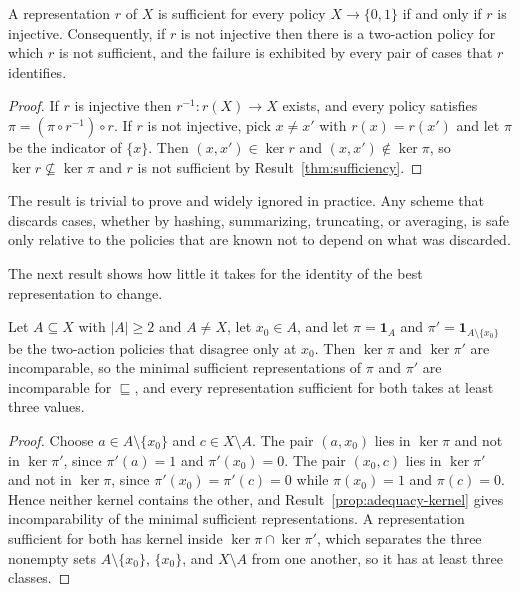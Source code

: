 \begin{newresult}\label{prop:no-free-compression}
A representation $r$ of $X$ is sufficient for every policy $X\to\{0,1\}$ if and only if $r$ is injective. Consequently, if $r$ is not injective then there is a two-action policy for which $r$ is not sufficient, and the failure is exhibited by every pair of cases that $r$ identifies.
\end{newresult}
\begin{proof}
If $r$ is injective then $r^{-1}:r(X)\to X$ exists, and every policy satisfies $\pi=(\pi\circ r^{-1})\circ r$. If $r$ is not injective, pick $x\ne x'$ with $r(x)=r(x')$ and let $\pi$ be the indicator of $\{x\}$. Then $(x,x')\in\ker r$ and $(x,x')\notin\ker\pi$, so $\ker r\not\subseteq\ker\pi$ and $r$ is not sufficient by Result~\ref{thm:sufficiency}.
\end{proof}

The result is trivial to prove and widely ignored in practice. Any scheme that discards cases, whether by hashing, summarizing, truncating, or averaging, is safe only relative to the policies that are known not to depend on what was discarded.

The next result shows how little it takes for the identity of the best representation to change.

\begin{newresult}\label{prop:sensitivity}
Let $A\subseteq X$ with $|A|\ge2$ and $A\ne X$, let $x_0\in A$, and let $\pi=\mathbf 1_A$ and $\pi'=\mathbf 1_{A\setminus\{x_0\}}$ be the two-action policies that disagree only at $x_0$. Then $\ker\pi$ and $\ker\pi'$ are incomparable, so the minimal sufficient representations of $\pi$ and $\pi'$ are incomparable for $\sqsubseteq$, and every representation sufficient for both takes at least three values.
\end{newresult}
\begin{proof}
Choose $a\in A\setminus\{x_0\}$ and $c\in X\setminus A$. The pair $(a,x_0)$ lies in $\ker\pi$ and not in $\ker\pi'$, since $\pi'(a)=1$ and $\pi'(x_0)=0$. The pair $(x_0,c)$ lies in $\ker\pi'$ and not in $\ker\pi$, since $\pi'(x_0)=\pi'(c)=0$ while $\pi(x_0)=1$ and $\pi(c)=0$. Hence neither kernel contains the other, and Result~\ref{prop:adequacy-kernel} gives incomparability of the minimal sufficient representations. A representation sufficient for both has kernel inside $\ker\pi\cap\ker\pi'$, which separates the three nonempty sets $A\setminus\{x_0\}$, $\{x_0\}$, and $X\setminus A$ from one another, so it has at least three classes.
\end{proof}

